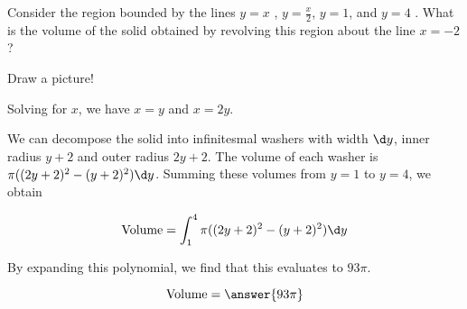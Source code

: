 \documentclass{ximera}
\author{Steven Gubkin}
\begin{document}
\begin{exercise}



Consider the region bounded by the lines $y = x$ , $y=\frac{x}{2}$, $y=1$, and $y = 4$ .  What is the volume of the solid obtained by revolving this region about the line $x=-2$?

\begin{hint}
	Draw a picture!
\end{hint}

\begin{hint}
	Solving for $x$, we have $x=y$ and $x = 2y$.
\end{hint}

\begin{hint}
	We can decompose the solid into infinitesmal washers with width $\d y$, inner radius $y+2$ and outer radius $2y+2$. The volume of each washer is $\pi((2y+2)^2-(y+2)^2)\d y$.  Summing these volumes from $y=1$ to $y=4$, we obtain

	\[
	\textrm{Volume} = \int_1^4 \pi((2y+2)^2-(y+2)^2)\d y
	\]
\end{hint}


\begin{hint}
	By expanding this polynomial, we find that this evaluates to $93\pi$.
\end{hint}

\begin{prompt}
	\[
		\textrm{Volume} = \answer{93\pi}
	\]
\end{prompt}

\end{exercise}
\end{document}
